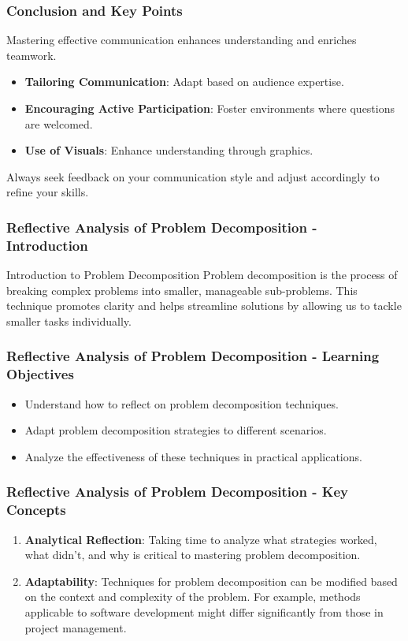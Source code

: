 \documentclass[aspectratio=169]{beamer}
\begin{document}
\begin{frame}[fragile]
    \frametitle{Conclusion and Key Points}
    Mastering effective communication enhances understanding and enriches teamwork.
    \begin{itemize}
        \item \textbf{Tailoring Communication}: Adapt based on audience expertise.
        \item \textbf{Encouraging Active Participation}: Foster environments where questions are welcomed.
        \item \textbf{Use of Visuals}: Enhance understanding through graphics.
    \end{itemize}

    Always seek feedback on your communication style and adjust accordingly to refine your skills.
\end{frame}

\begin{frame}[fragile]
    \frametitle{Reflective Analysis of Problem Decomposition - Introduction}
    \begin{block}{Introduction to Problem Decomposition}
      Problem decomposition is the process of breaking complex problems into smaller, manageable sub-problems. This technique promotes clarity and helps streamline solutions by allowing us to tackle smaller tasks individually.
    \end{block}
\end{frame}

\begin{frame}[fragile]
    \frametitle{Reflective Analysis of Problem Decomposition - Learning Objectives}
    \begin{itemize}
        \item Understand how to reflect on problem decomposition techniques.
        \item Adapt problem decomposition strategies to different scenarios.
        \item Analyze the effectiveness of these techniques in practical applications.
    \end{itemize}
\end{frame}

\begin{frame}[fragile]
    \frametitle{Reflective Analysis of Problem Decomposition - Key Concepts}
    \begin{enumerate}
        \item \textbf{Analytical Reflection}: Taking time to analyze what strategies worked, what didn’t, and why is critical to mastering problem decomposition.
        \item \textbf{Adaptability}: Techniques for problem decomposition can be modified based on the context and complexity of the problem. For example, methods applicable to software development might differ significantly from those in project management.
    \end{enumerate}
\end{frame}
\end{document}
